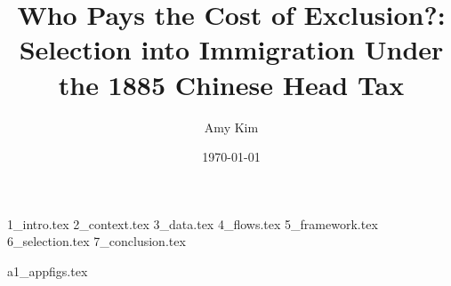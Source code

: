 \documentclass[12pt]{article}
\title{Who Pays the Cost of Exclusion?: Selection into Immigration Under the 1885 Chinese Head Tax}
\author{Amy Kim}
\date{\today}
\begin{document}
\maketitle


{1_intro.tex}
{2_context.tex}
{3_data.tex}
{4_flows.tex}
{5_framework.tex}
{6_selection.tex}
{7_conclusion.tex}

\newpage


\newpage
\appendix 
{a1_appfigs.tex}
\end{document}
